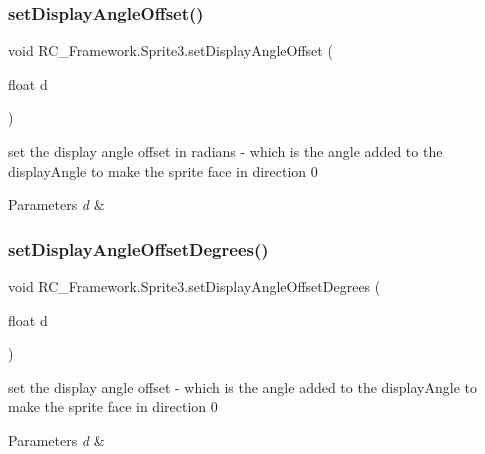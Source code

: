 \subsubsection{\texorpdfstring{set\+Display\+Angle\+Offset()}{setDisplayAngleOffset()}}
{\footnotesize\ttfamily void R\+C\+\_\+\+Framework.\+Sprite3.\+set\+Display\+Angle\+Offset (\begin{DoxyParamCaption}\item[{float}]{d }\end{DoxyParamCaption})}



set the display angle offset in radians -\/ which is the angle added to the display\+Angle to make the sprite face in direction 0 


\begin{DoxyParams}{Parameters}
{\em d} & \\
\hline
\end{DoxyParams}
\mbox{\label{class_r_c___framework_1_1_sprite3_a6269a6c50ca875525156d347b216e491}} 
\subsubsection{\texorpdfstring{set\+Display\+Angle\+Offset\+Degrees()}{setDisplayAngleOffsetDegrees()}}
{\footnotesize\ttfamily void R\+C\+\_\+\+Framework.\+Sprite3.\+set\+Display\+Angle\+Offset\+Degrees (\begin{DoxyParamCaption}\item[{float}]{d }\end{DoxyParamCaption})}



set the display angle offset -\/ which is the angle added to the display\+Angle to make the sprite face in direction 0 


\begin{DoxyParams}{Parameters}
{\em d} & \\
\hline
\end{DoxyParams}
\mbox{\label{class_r_c___framework_1_1_sprite3_a3e00764164dccc3eb6104e5ec643033a}} 
